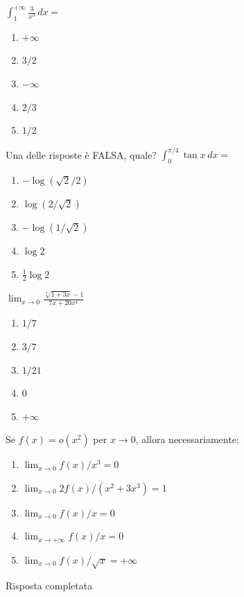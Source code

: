 \begin{quiz}
$\displaystyle\int_1^{+\infty}\frac3{x^3}\,dx=$
\begin{enumerate}[label=\alph*),leftmargin=1.3cm,itemsep=3pt,topsep=5pt]
\item $+\infty$
\item $3/2$
\item $-\infty$
\item $2/3$
\item $1/2$
\end{enumerate}
\end{quiz}

\begin{quiz}
Una delle risposte \`e FALSA, quale? $\displaystyle\int_0^{\pi/4}\tan x\,dx=$
\begin{enumerate}[label=\alph*),leftmargin=1.3cm,itemsep=3pt,topsep=5pt]
\item $-\log(\sqrt2/2)$
\item $\log(2/\sqrt2)$
\item $-\log(1/\sqrt2)$
\item $\log2$
\item $\frac12\log2$
\end{enumerate}
\end{quiz}

\begin{quiz}
$\displaystyle\lim_{x\to0}\frac{\sqrt[3]{1+3x}-1}{7x+20x^4}$
\begin{enumerate}[label=\alph*),leftmargin=1.3cm,itemsep=3pt,topsep=5pt]
\item $1/7$
\item $3/7$
\item $1/21$
\item $0$
\item $+\infty$
\end{enumerate}
\end{quiz}

\begin{quiz}
Se $f(x)=o(x^2)$ per $x\to0$, allora necessariamente:
\begin{enumerate}[label=\alph*),leftmargin=1.3cm,itemsep=3pt,topsep=5pt]
\item $\lim_{x\to0}f(x)/x^3=0$
\item $\lim_{x\to0}2f(x)/(x^2+3x^3)=1$
\item $\lim_{x\to0}f(x)/x=0$
\item $\lim_{x\to+\infty}f(x)/x=0$
\item $\lim_{x\to0}f(x)/\sqrt{x}=+\infty$
\end{enumerate}
\end{quiz}
Risposta completata
